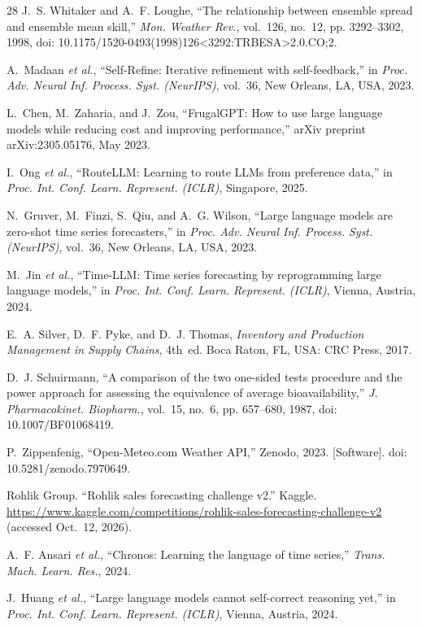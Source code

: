 \documentclass[conference]{IEEEtran}
\begin{document}
\begin{thebibliography}{28}
J.~S. Whitaker and A.~F. Loughe, ``The relationship between ensemble spread and ensemble mean
skill,'' \emph{Mon. Weather Rev.}, vol.~126, no.~12, pp. 3292--3302, 1998,
doi: 10.1175/1520-0493(1998)126<3292:TRBESA>2.0.CO;2.

A.~Madaan \emph{et al.}, ``Self-Refine: Iterative refinement with self-feedback,'' in \emph{Proc.
Adv. Neural Inf. Process. Syst. (NeurIPS)}, vol.~36, New Orleans, LA, USA, 2023.

L.~Chen, M.~Zaharia, and J.~Zou, ``FrugalGPT: How to use large language models while reducing cost
and improving performance,'' arXiv preprint arXiv:2305.05176, May 2023.

I.~Ong \emph{et al.}, ``RouteLLM: Learning to route LLMs from preference data,'' in \emph{Proc.
Int. Conf. Learn. Represent. (ICLR)}, Singapore, 2025.

N.~Gruver, M.~Finzi, S.~Qiu, and A.~G. Wilson, ``Large language models are zero-shot time series
forecasters,'' in \emph{Proc. Adv. Neural Inf. Process. Syst. (NeurIPS)}, vol.~36, New Orleans, LA,
USA, 2023.

M.~Jin \emph{et al.}, ``Time-LLM: Time series forecasting by reprogramming large language
models,'' in \emph{Proc. Int. Conf. Learn. Represent. (ICLR)}, Vienna, Austria, 2024.

E.~A. Silver, D.~F. Pyke, and D.~J. Thomas, \emph{Inventory and Production Management in Supply
Chains}, 4th~ed. Boca Raton, FL, USA: CRC Press, 2017.

D.~J. Schuirmann, ``A comparison of the two one-sided tests procedure and the power approach for
assessing the equivalence of average bioavailability,'' \emph{J. Pharmacokinet. Biopharm.},
vol.~15, no.~6, pp. 657--680, 1987, doi: 10.1007/BF01068419.

P.~Zippenfenig, ``Open-Meteo.com Weather API,'' Zenodo, 2023. [Software]. doi:
10.5281/zenodo.7970649.

Rohlik Group. ``Rohlik sales forecasting challenge v2.'' Kaggle.
\url{https://www.kaggle.com/competitions/rohlik-sales-forecasting-challenge-v2} (accessed Oct.~12,
2026).

A.~F. Ansari \emph{et al.}, ``Chronos: Learning the language of time series,'' \emph{Trans. Mach.
Learn. Res.}, 2024.

J.~Huang \emph{et al.}, ``Large language models cannot self-correct reasoning yet,'' in
\emph{Proc. Int. Conf. Learn. Represent. (ICLR)}, Vienna, Austria, 2024.


\end{thebibliography}
\end{document}
